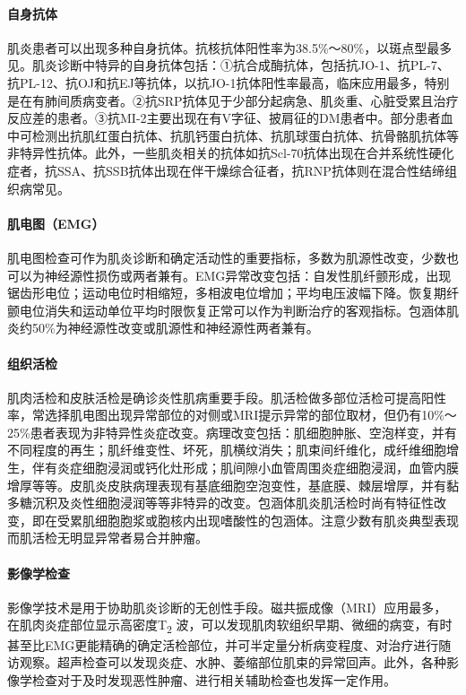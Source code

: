 \paragraph{自身抗体}

肌炎患者可以出现多种自身抗体。抗核抗体阳性率为38.5\%～80\%，以斑点型最多见。肌炎诊断中特异的自身抗体包括：①抗合成酶抗体，包括抗JO-1、抗PL-7、抗PL-12、抗OJ和抗EJ等抗体，以抗JO-1抗体阳性率最高，临床应用最多，特别是在有肺间质病变者。②抗SRP抗体见于少部分起病急、肌炎重、心脏受累且治疗反应差的患者。③抗MI-2主要出现在有V字征、披肩征的DM患者中。部分患者血中可检测出抗肌红蛋白抗体、抗肌钙蛋白抗体、抗肌球蛋白抗体、抗骨骼肌抗体等非特异性抗体。此外，一些肌炎相关的抗体如抗Scl-70抗体出现在合并系统性硬化症者，抗SSA、抗SSB抗体出现在伴干燥综合征者，抗RNP抗体则在混合性结缔组织病常见。

\paragraph{肌电图（EMG）}

肌电图检查可作为肌炎诊断和确定活动性的重要指标，多数为肌源性改变，少数也可以为神经源性损伤或两者兼有。EMG异常改变包括：自发性肌纤颤形成，出现锯齿形电位；运动电位时相缩短，多相波电位增加；平均电压波幅下降。恢复期纤颤电位消失和运动单位平均时限恢复正常可以作为判断治疗的客观指标。包涵体肌炎约50\%为神经源性改变或肌源性和神经源性两者兼有。

\paragraph{组织活检}

肌肉活检和皮肤活检是确诊炎性肌病重要手段。肌活检做多部位活检可提高阳性率，常选择肌电图出现异常部位的对侧或MRI提示异常的部位取材，但仍有10\%～25\%患者表现为非特异性炎症改变。病理改变包括：肌细胞肿胀、空泡样变，并有不同程度的再生；肌纤维变性、坏死，肌横纹消失；肌束间纤维化，成纤维细胞增生，伴有炎症细胞浸润或钙化灶形成；肌间隙小血管周围炎症细胞浸润，血管内膜增厚等等。皮肌炎皮肤病理表现有基底细胞空泡变性，基底膜、棘层增厚，并有黏多糖沉积及炎性细胞浸润等等非特异的改变。包涵体肌炎肌活检时尚有特征性改变，即在受累肌细胞胞浆或胞核内出现嗜酸性的包涵体。注意少数有肌炎典型表现而肌活检无明显异常者易合并肿瘤。

\paragraph{影像学检查}

影像学技术是用于协助肌炎诊断的无创性手段。磁共振成像（MRI）应用最多，在肌肉炎症部位显示高密度T\textsubscript{2}
波，可以发现肌肉软组织早期、微细的病变，有时甚至比EMG更能精确的确定活检部位，并可半定量分析病变程度、对治疗进行随访观察。超声检查可以发现炎症、水肿、萎缩部位肌束的异常回声。此外，各种影像学检查对于及时发现恶性肿瘤、进行相关辅助检查也发挥一定作用。

